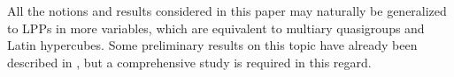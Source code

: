 \documentclass[pdflatex,sn-mathphys-num]{sn-jnl}
\theoremstyle{thmstyleone}%
\begin{document}
\vspace{0.2cm}


All the notions and results considered in this paper may naturally be generalized to LPPs in more variables, which are equivalent to multiary quasigroups and Latin hypercubes. Some preliminary results on this topic have already been described in \cite{Diestelkamp2004, Gutierrez2023, Gutierrez2025,Gutierrez2025a, Mullen1980a}, but a comprehensive study is required in this regard.


\end{document}
